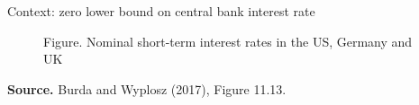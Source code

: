 \documentclass{beamer}
\newcommand{\tb}[1]{{\color{blue}{\textbf{#1}}}}
\begin{document}
\begin{frame}{Context: zero lower bound on central bank interest rate}

\begin{center}

\begin{figure}[h!]
\caption{Figure. Nominal short-term interest rates in the US, Germany and UK}
	
\end{figure}

\begin{minipage}{0.6\columnwidth}
\tiny	
\textbf{Source.} Burda and Wyplosz (2017), Figure 11.13.\\
\end{minipage}
\end{center}

\end{frame}
\end{document}
